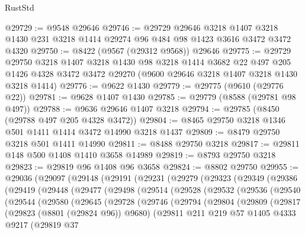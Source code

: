 \begin{lexlean}{RustStd}
\begin{coremodule}
@29729 := @9548 @29646
@29746 := @29729
    @29646
    @3218
    @1407
    @3218
    @1430
    @231
    @3218
    @1414
    @29274
    @96
    @484
    @98
    @1423
    @3616
    @3472
    @3472
    @4320
@29750 := @8422 (@9567 (@29312 @9568)) @29646
@29775 := @29729
    @29750
    @3218
    @1407
    @3218
    @1430
    @98
    @3218
    @1414
    @3682
    @22
    @497
    @205
    @1426
    @4328
    @3472
    @3472
    @29270
    (@9600 @29646 @3218 @1407 @3218 @1430 @3218 @1414)
@29776 := @9622 @1430
@29779 := @29775 (@9610 (@29776 @22))
@29781 := @9628 @1407 @1430
@29785 := @29779 (@8588 (@29781 @98 @497))
@29788 := @9636 @29646 @1407 @3218
@29794 := @29785 (@8450 (@29788 @497 @205 @4328 @3472))
@29804 := @8465 @29750 @3218 @1346 @501 @1411 @1414 @3472 @14990 @3218 @1437
@29809 := @8479 @29750 @3218 @501 @1411 @14990
@29811 := @8488 @29750 @3218
@29817 := @29811 @148 @500 @1408 @1410 @3658 @14989
@29819 := @8793 @29750 @3218
@29823 := @29819 @96 @1408 @96 @3658
@29824 := @8802 @29750
@29955 := @29036
    (@29097
      (@29148
        (@29191
          (@29231
            (@29279
              (@29323
                (@29349
                  (@29386
                    (@29419
                      (@29448
                        (@29477
                          (@29498
                            (@29514
                              (@29528
                                (@29532
                                  (@29536
                                    (@29540
                                      (@29544
                                        (@29580
                                          (@29645
                                            (@29728
                                              (@29746
                                                (@29794
                                                  (@29804
                                                    (@29809
                                                      (@29817
                                                        (@29823 (@8801 (@29824 @96)) @9680)
                                                        (@29811
                                                          @211
                                                          @219
                                                          @57
                                                          @1405
                                                          @4333
                                                          @9217
                                                          (@29819
                                                            @37

\end{coremodule}
\end{lexlean}
